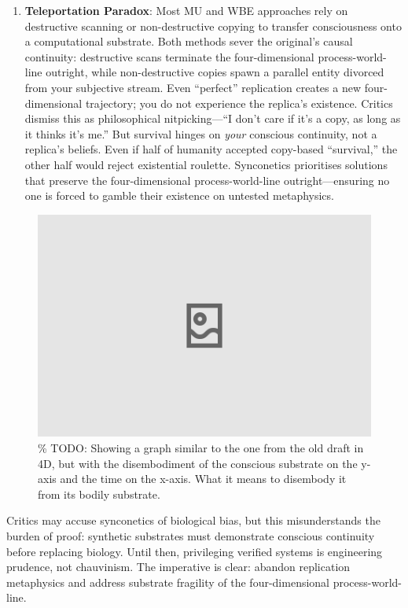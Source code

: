\documentclass[10pt]{article}
\begin{document}
\begin{sloppypar}
\begin{enumerate}
    \item \textbf{Teleportation Paradox}: Most MU and WBE approaches rely on destructive scanning or non-destructive copying to transfer consciousness onto a computational substrate. Both methods sever the original’s causal continuity: destructive scans terminate the four-dimensional process-world-line outright, while non-destructive copies spawn a parallel entity divorced from your subjective stream. Even “perfect” replication creates a new four-dimensional trajectory; you do not experience the replica’s existence. Critics dismiss this as philosophical nitpicking—“I don’t care if it’s a copy, as long as it thinks it’s me.” But survival hinges on \emph{your} conscious continuity, not a replica’s beliefs. Even if half of humanity accepted copy-based “survival,” the other half would reject existential roulette. Synconetics prioritises solutions that preserve the four-dimensional process-world-line outright—ensuring no one is forced to gamble their existence on untested metaphysics.
  \end{enumerate}

  \begin{figure}[ht!]
    \centering
    \includegraphics[width=\textwidth]{figures/4d-trajectory-disembodiment.png}
    \caption{\% TODO: Showing a graph similar to the one from the old draft in 4D, but with the disembodiment of the conscious substrate on the y-axis and the time on the x-axis. What it means to disembody it from its bodily substrate.}
    \label{fig:4d-trajectory-disembodiment}
  \end{figure}

  Critics may accuse synconetics of biological bias, but this misunderstands the burden of proof: synthetic substrates must demonstrate conscious continuity before replacing biology. Until then, privileging verified systems is engineering prudence, not chauvinism. The imperative is clear: abandon replication metaphysics and address substrate fragility of the four-dimensional process-world-line.


\end{sloppypar}
\end{document}
